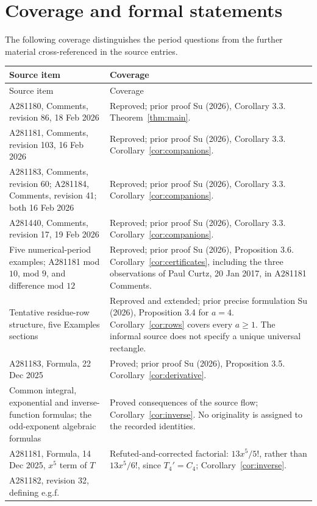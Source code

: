 \documentclass[11pt]{article}
\begin{document}
\section{Coverage and formal statements}
The following coverage distinguishes the period questions from
the further material cross-referenced in the source entries.
{\small
\begin{longtable}{@{}p{.30\linewidth}p{.65\linewidth}@{}}\toprule
Source item & Coverage\\\midrule
\endfirsthead
\toprule Source item & Coverage\\\midrule
\endhead
\bottomrule\endfoot
A281180, Comments, revision 86, 18 Feb 2026
 & Reproved; prior proof Su (2026), Corollary 3.3. Theorem~\ref{thm:main}.\\
A281181, Comments, revision 103, 16 Feb 2026
 & Reproved; prior proof Su (2026), Corollary 3.3.
 Corollary~\ref{cor:companions}.\\
A281183, Comments, revision 60; A281184, Comments, revision 41;
 both 16 Feb 2026
 & Reproved; prior proof Su (2026), Corollary 3.3.
 Corollary~\ref{cor:companions}.\\
A281440, Comments, revision 17, 19 Feb 2026
 & Reproved; prior proof Su (2026), Corollary 3.3.
 Corollary~\ref{cor:companions}.\\
Five numerical-period examples; A281181 mod $10$, mod $9$, and difference mod $12$
 & Reproved; prior proof Su (2026), Proposition 3.6.
 Corollary~\ref{cor:certificates}, including the three observations of
 Paul Curtz, 20 Jan 2017, in A281181 Comments.\\
Tentative residue-row structure, five Examples sections
 & Reproved and extended; prior precise formulation Su (2026),
 Proposition 3.4 for $a=4$. Corollary~\ref{cor:rows} covers every $a\ge1$.
 The informal source does not specify a unique universal rectangle.\\
A281183, Formula, 22 Dec 2025
 & Proved; prior proof Su (2026), Proposition 3.5.
 Corollary~\ref{cor:derivative}.\\
Common integral, exponential and inverse-function formulas;
the odd-exponent algebraic formulas
 & Proved consequences of the source flow; Corollary~\ref{cor:inverse}.
 No originality is assigned to the recorded identities.\\
A281181, Formula, 14 Dec 2025, $x^5$ term of $T$
 & Refuted-and-corrected factorial: $13x^5/5!$, rather than
 $13x^5/6!$, since $T_4'=C_4$; Corollary~\ref{cor:inverse}.\\
A281182, revision 32, defining e.g.f.

\end{longtable}}
\end{document}
